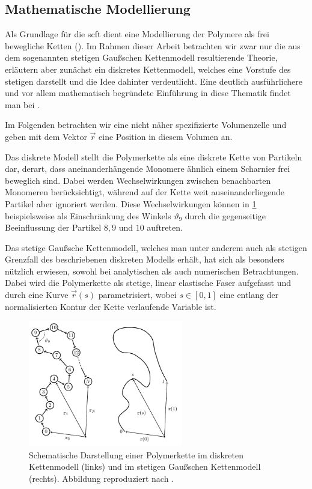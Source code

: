 \documentclass[../main.tex]{subfiles}
\begin{document}
\subsection*{Mathematische Modellierung} %

Als Grundlage für die \acl{scft} dient eine Modellierung der Polymere als frei bewegliche Ketten ().
Im Rahmen dieser Arbeit betrachten wir zwar nur die aus dem sogenannten stetigen Gaußschen Kettenmodell resultierende Theorie, erläutern aber zunächst ein diskretes Kettenmodell, welches eine Vorstufe des stetigen darstellt und die Idee dahinter verdeutlicht.
Eine deutlich ausführlichere und vor allem mathematisch begründete Einführung in diese Thematik findet man bei \textcites[Chapter 2]{Fredrickson:2006th}{rubinstein2003polymer}.

Im Folgenden betrachten wir eine nicht näher spezifizierte Volumenzelle und geben mit dem Vektor $\vec{r}$ eine Position in diesem Volumen an.

Das diskrete Modell stellt die Polymerkette als eine diskrete Kette von Partikeln dar, derart, dass aneinanderhängende Monomere ähnlich einem Scharnier frei beweglich sind.
Dabei werden Wechselwirkungen zwischen benachbarten Monomeren berücksichtigt, während auf der Kette weit auseinanderliegende Partikel aber ignoriert werden.
Diese Wechselwirkungen können in \cref{figure:kettenmodelle} beispielsweise als Einschränkung des Winkels $\vartheta_9$ durch die gegenseitige Beeinflussung der Partikel $8, 9$ und $10$ auftreten.

Das stetige Gaußsche Kettenmodell, welches man unter anderem auch als stetigen Grenzfall des beschriebenen diskreten Modells erhält, hat sich als besonders nützlich erwiesen, sowohl bei analytischen als auch numerischen Betrachtungen.
Dabei wird die Polymerkette als stetige, linear elastische Faser aufgefasst und durch eine Kurve $\vec{r}(s)$ parametrisiert, wobei $s \in [0, 1]$ eine entlang der normalisierten Kontur der Kette verlaufende Variable ist.

\begin{figure}[tb]
    \centering
        \includegraphics[width=0.6\textwidth]{figures/einleitung/chainmodell.pdf}
    \caption[%
        Polymerkette in diskretem und Gaußschen Kettenmodell
    ]{%
        Schematische Darstellung einer Polymerkette im diskreten Kettenmodell (links) und im stetigen Gaußschen Kettenmodell (rechts).
        Abbildung reproduziert nach \cite[Figure 2.1 und 2.5]{Fredrickson:2006th}.
    }
    \label{figure:kettenmodelle}
\end{figure}
\end{document}
